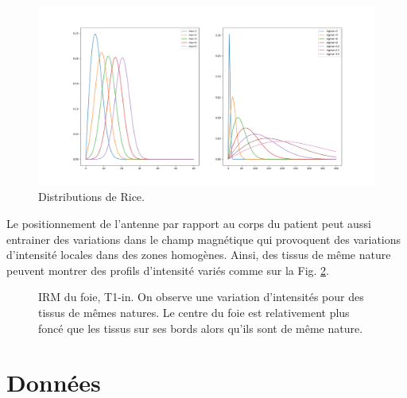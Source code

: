 \begin{figure}
    \centering
    \includegraphics[height=6cm]{Images/noise_CT_2.png}
    \caption{Distributions de Rice. }
    \label{fig:MRI_Rice}
\end{figure}

Le positionnement de l'antenne par rapport au corps du patient peut aussi entrainer des variations dans le champ magnétique qui provoquent des variations d'intensité locales dans des zones homogènes. Ainsi, des tissus de même nature peuvent montrer des profils d'intensité variés comme sur la Fig. \ref{fig:MRI_variations}.

\begin{figure}
    \centering
    \caption{IRM du foie, T1-in. On observe une variation d'intensités pour des tissus de mêmes natures. Le centre du foie est relativement plus foncé que les tissus sur ses bords alors qu'ils sont de même nature.}
    \label{fig:MRI_variations}
\end{figure}

\section{Données}

